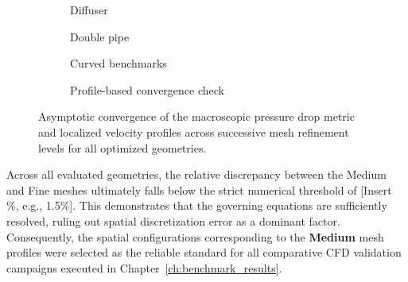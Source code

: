 \begin{figure}[htpb]
	\centering
	\begin{subfigure}[b]{0.48\textwidth}
		\centering
		\caption{Diffuser}
		\label{fig:app_mesh_diffuser}
	\end{subfigure}
	\hfill
	\begin{subfigure}[b]{0.48\textwidth}
		\centering
		\caption{Double pipe}
		\label{fig:app_mesh_doublepipe}
	\end{subfigure}
	
	\vspace{0.5cm}
	
	\begin{subfigure}[b]{0.48\textwidth}
		\centering
		\caption{Curved benchmarks}
		\label{fig:app_mesh_curved}
	\end{subfigure}
	\hfill
	\begin{subfigure}[b]{0.48\textwidth}
		\centering
		\caption{Profile-based convergence check}
		\label{fig:app_mesh_profiles}
	\end{subfigure}
	\caption{Asymptotic convergence of the macroscopic pressure drop metric and localized velocity profiles across successive mesh refinement levels for all optimized geometries.}
	\label{fig:app_opt_mesh_study}
\end{figure}

Across all evaluated geometries, the relative discrepancy between the Medium and Fine meshes ultimately falls below the strict numerical threshold of [Insert \%, e.g., 1.5\%]. This demonstrates that the governing equations are sufficiently resolved, ruling out spatial discretization error as a dominant factor. Consequently, the spatial configurations corresponding to the \textbf{Medium} mesh profiles were selected as the reliable standard for all comparative CFD validation campaigns executed in Chapter~\ref{ch:benchmark_results}.